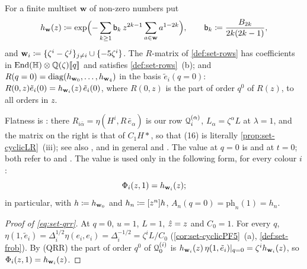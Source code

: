 \begin{thm}[Flatness of the $R$-matrix and its value at $q=0$, (QRR); quoted]
\label{thm:set-qrr}
For a finite multiset $\mathbf w$ of non-zero numbers put
\begin{equation}
\label{eq:set-hw}
h_{\mathbf{w}}(z)\coloneqq\exp\Bigl(-\sum_{k\geq1}\mathsf{b}_k\,z^{2k-1}\sum_{a\in\mathbf w}a^{1-2k}\Bigr),\qquad\mathsf{b}_k\coloneqq\frac{B_{2k}}{2k(2k-1)},
\end{equation}
and $\mathbf{w}_i\coloneqq\{\zeta^i-\zeta^j\}_{j\neq i}\cup\{-5\zeta^i\}$. The $R$-matrix of \cref{def:set-rows} has coefficients in $\operatorname{End}(\mathbb{H})\otimes\mathbb{Q}(\zeta)[\![ q ]\!]$ and satisfies \cref{def:set-rows}~(b); and $R(q=0)=\operatorname{diag}(h_{\mathbf{w}_0},\dots,h_{\mathbf{w}_4})$ in the basis $\tilde e_i(q=0)$: $R(0,z)\tilde e_i(0)=h_{\mathbf{w}_i}(z)\,\tilde e_i(0)$, where $R(0,z)$ is the part of order $q^0$ of $R(z)$, to all orders in $z$.
\end{thm}

Flatness is \cite[Lemma~5.2, (16)]{GJR18}: there $R_{i\bar\alpha}=\eta(H^i,R\,\bar e_\alpha)$ is our row $\mathcal{Q}^{(\alpha)}_i$, $L_\alpha=\zeta^\alpha L$ at $\lambda=1$, and the matrix on the right is that of $C_1H*$, so that (16) is literally \cref{prop:set-cyclicLR}~(iii); see also \cite[\S4.2, (12)--(13)]{GJR17}, and in general \cite[Section~1, Proposition (a)--(c)]{Giv01} and \cite[Props.~7.7, 8.2~(ii), 8.4, 8.7~(ii)]{MR2917177}. The value at $q=0$ is \cite[proof of Lemma~5.2, (17)]{GJR18} and \cite[proof of Lemma~4.6, (19)--(20)]{GJR17} at $t=0$; both refer to \cite[Section~2.2, Theorem~1 and the Remark after it]{Giv01} and \cite[Theorem~1, Corollary~1]{MR2276766}. The value is used only in the following form, for every colour $i$:
\begin{equation}
\label{eq:set-qrr}
\Phi_i(z,1)=h_{\mathbf{w}_i}(z);
\end{equation}
in particular, with $h\coloneqq h_{\mathbf{w}_0}$ and $h_n\coloneqq[z^n]h$, $A_n(q=0)=\mathrm{ph}_n(1)=h_n$.

\begin{proof}[Proof of \eqref{eq:set-qrr}]
At $q=0$, $u=1$, $L=1$, $\hat{z}=z$ and $C_0=1$. For every $q$, $\eta(1,\tilde e_i)=\Delta_i^{1/2}\eta(e_i,e_i)=\Delta_i^{-1/2}=\zeta^iL/C_0$ (\cref{cor:set-cyclicPF5}~(a), \cref{def:set-frob}). By (QRR) the part of order $q^0$ of $\mathcal{Q}^{(i)}_0$ is $h_{\mathbf{w}_i}(z)\,\eta(1,\tilde e_i)|_{q=0}=\zeta^ih_{\mathbf{w}_i}(z)$, so $\Phi_i(z,1)=h_{\mathbf{w}_i}(z)$.
\end{proof}

